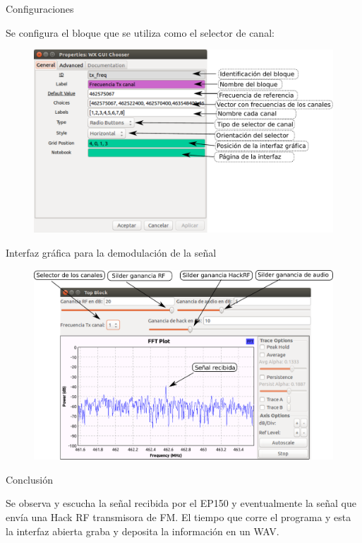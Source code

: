 \begin{frame}{Configuraciones}

Se configura el bloque que se utiliza como el selector de canal:

\begin{figure}[H]
\centering
\vspace{-3mm}
\includegraphics[width=\textwidth]{parte3/lab10/pdf/lab10_11.pdf}
\end{figure}

\end{frame}

\begin{frame}{Interfaz gráfica para la demodulación de la señal}

\begin{figure}[H]
\centering
\vspace{-3mm}
\includegraphics[width=\textwidth]{parte3/lab10/pdf/lab10_12.pdf}
\end{figure}

\end{frame}

\begin{frame}{Conclusión}

Se observa y escucha la señal recibida por el EP150 y eventualmente la señal que envía una Hack RF transmisora de FM. El tiempo que corre el programa y esta la interfaz abierta graba y deposita la información en un WAV.

\end{frame}

